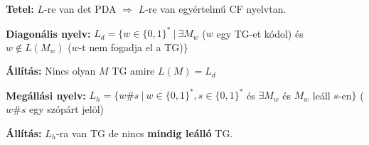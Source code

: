 \documentclass[a4paper]{article}
\begin{document}
\begin{tcolorbox}[size = fbox]
  \textbf{Tetel:} $L$-re van det PDA $\Rightarrow$ $L$-re van egyértelmű CF nyelvtan.
\end{tcolorbox}

\begin{tcolorbox}[size = fbox]
  \textbf{Diagonális nyelv:} $L_d = \{ w \in \{0,1\}^*\ |\ \exists M_w $ ($w$ egy TG-et kódol) és $w \notin L(M_w)$ ($w$-t nem fogadja el a TG)$\}$ 
\end{tcolorbox}

\begin{tcolorbox}[size = fbox]
  \textbf{Állítás:} Nincs olyan $M$ TG amire $L(M) = L_d$
\end{tcolorbox}

\begin{tcolorbox}[size = fbox]
  \textbf{Megállási nyelv:} $L_h = \{ w\#s \ |\ w \in \{0,1\}^*, s \in \{0,1\}^*$ és $\exists M_w$ és $M_w$ leáll $s$-en$\}$ ($w\#s$ egy szópárt jelöl)
\end{tcolorbox}

\begin{tcolorbox}[size = fbox]
  \textbf{Állítás:} $L_h$-ra van TG de nincs \textbf{mindig leálló} TG.
\end{tcolorbox}
\end{document}

